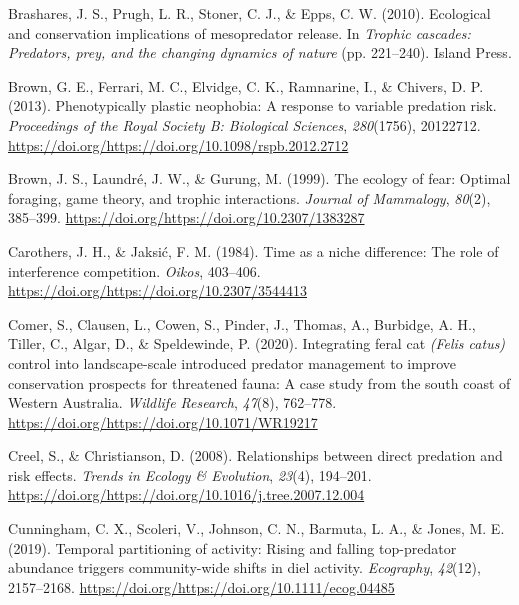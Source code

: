 \documentclass[]{elsarticle} %
\begin{document}
\leavevmode\hypertarget{ref-brashares2010ecological}{}%
Brashares, J. S., Prugh, L. R., Stoner, C. J., \& Epps, C. W. (2010). Ecological and conservation implications of mesopredator release. In \emph{Trophic cascades: Predators, prey, and the changing dynamics of nature} (pp. 221--240). Island Press.

\leavevmode\hypertarget{ref-brown2013phenotypically}{}%
Brown, G. E., Ferrari, M. C., Elvidge, C. K., Ramnarine, I., \& Chivers, D. P. (2013). Phenotypically plastic neophobia: A response to variable predation risk. \emph{Proceedings of the Royal Society B: Biological Sciences}, \emph{280}(1756), 20122712. \url{https://doi.org/https://doi.org/10.1098/rspb.2012.2712}

\leavevmode\hypertarget{ref-brown1999ecology}{}%
Brown, J. S., Laundré, J. W., \& Gurung, M. (1999). The ecology of fear: Optimal foraging, game theory, and trophic interactions. \emph{Journal of Mammalogy}, \emph{80}(2), 385--399. \url{https://doi.org/https://doi.org/10.2307/1383287}

\leavevmode\hypertarget{ref-carothers1984time}{}%
Carothers, J. H., \& Jaksić, F. M. (1984). Time as a niche difference: The role of interference competition. \emph{Oikos}, 403--406. \url{https://doi.org/https://doi.org/10.2307/3544413}

\leavevmode\hypertarget{ref-comer2020integrating}{}%
Comer, S., Clausen, L., Cowen, S., Pinder, J., Thomas, A., Burbidge, A. H., Tiller, C., Algar, D., \& Speldewinde, P. (2020). Integrating feral cat \emph{(Felis catus)} control into landscape-scale introduced predator management to improve conservation prospects for threatened fauna: A case study from the south coast of Western Australia. \emph{Wildlife Research}, \emph{47}(8), 762--778. \url{https://doi.org/https://doi.org/10.1071/WR19217}

\leavevmode\hypertarget{ref-creel2008relationships}{}%
Creel, S., \& Christianson, D. (2008). Relationships between direct predation and risk effects. \emph{Trends in Ecology \& Evolution}, \emph{23}(4), 194--201. \url{https://doi.org/https://doi.org/10.1016/j.tree.2007.12.004}

\leavevmode\hypertarget{ref-cunningham2019temporal}{}%
Cunningham, C. X., Scoleri, V., Johnson, C. N., Barmuta, L. A., \& Jones, M. E. (2019). Temporal partitioning of activity: Rising and falling top-predator abundance triggers community-wide shifts in diel activity. \emph{Ecography}, \emph{42}(12), 2157--2168. \url{https://doi.org/https://doi.org/10.1111/ecog.04485}
\end{document}
